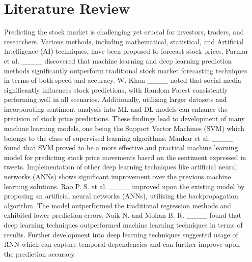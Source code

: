 \section{Literature Review}
Predicting the stock market is challenging yet crucial for investors, traders, and researchers. Various methods, including mathematical, statistical, and Artificial Intelligence (AI) techniques, have been proposed to forecast stock prices. Parmar et al. ____ discovered that machine learning and deep learning prediction methods significantly outperform traditional stock market forecasting techniques in terms of both speed and accuracy. W. Khan ____ noted that social media significantly influences stock predictions, with Random Forest consistently performing well in all scenarios. Additionally, utilizing larger datasets and incorporating sentiment analysis into ML and DL models can enhance the precision of stock price predictions. These findings lead to development of many machine learning models, one being the Support Vector Machines (SVM) which belongs to the class of  supervised learning algorithms. Mankar et al. ____ found that SVM proved to be a more effective and practical machine learning model for predicting stock price movements based on the sentiment expressed in tweets. Implementation of other deep learning techniques like artificial neural networks (ANNs) shows significant improvement over the previous machine learning solutions. Rao P. S. et al. ____ improved upon the existing model by proposing an artificial neural networks (ANNs), utilizing the backpropagation algorithm. The model outperformed the traditional regression methods and exhibited lower prediction errors. Naik N. and Mohan B. R. ____ found that deep learning techniques outperformed machine learning techniques in terms of results. Further development into deep learning techniques suggested usage of RNN which can capture temporal dependencies and can further improve upon the prediction accuracy. 

